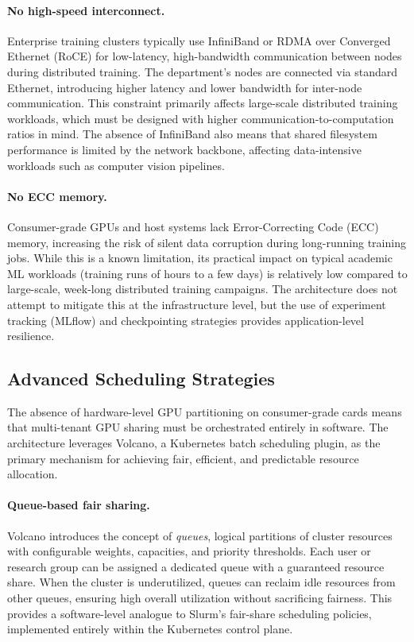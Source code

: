\paragraph{No high-speed interconnect.} Enterprise training clusters typically use InfiniBand or RDMA over Converged Ethernet (RoCE) for low-latency, high-bandwidth communication between nodes during distributed training. The department's nodes are connected via standard Ethernet, introducing higher latency and lower bandwidth for inter-node communication. This constraint primarily affects large-scale distributed training workloads, which must be designed with higher communication-to-computation ratios in mind. The absence of InfiniBand also means that shared filesystem performance is limited by the network backbone, affecting data-intensive workloads such as computer vision pipelines.

\paragraph{No ECC memory.} Consumer-grade GPUs and host systems lack Error-Correcting Code (ECC) memory, increasing the risk of silent data corruption during long-running training jobs. While this is a known limitation, its practical impact on typical academic ML workloads (training runs of hours to a few days) is relatively low compared to large-scale, week-long distributed training campaigns. The architecture does not attempt to mitigate this at the infrastructure level, but the use of experiment tracking (MLflow) and checkpointing strategies provides application-level resilience.

\subsection{Advanced Scheduling Strategies}

The absence of hardware-level GPU partitioning on consumer-grade cards means that multi-tenant GPU sharing must be orchestrated entirely in software. The architecture leverages Volcano, a Kubernetes batch scheduling plugin, as the primary mechanism for achieving fair, efficient, and predictable resource allocation.

\paragraph{Queue-based fair sharing.} Volcano introduces the concept of \emph{queues}, logical partitions of cluster resources with configurable weights, capacities, and priority thresholds. Each user or research group can be assigned a dedicated queue with a guaranteed resource share. When the cluster is underutilized, queues can reclaim idle resources from other queues, ensuring high overall utilization without sacrificing fairness. This provides a software-level analogue to Slurm's fair-share scheduling policies, implemented entirely within the Kubernetes control plane.

